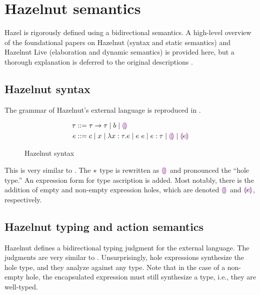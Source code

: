\section{Hazelnut semantics}
\label{sec:hazel-semantics}

Hazel is rigorously defined using a bidirectional semantics. A high-level overview of the foundational papers on Hazelnut (syntax and static semantics) and Hazelnut Live (elaboration and dynamic semantics) is provided here, but a thorough explanation is deferred to the original descriptions \cite{conf/popl/Hazelnut17,conf/popl/HazelnutLive19}.

\subsection{Hazelnut syntax}
\label{sec:hazel-syntax}

The grammar of Hazelnut's external language is reproduced in .

\begin{figure}
  \centering
  \begin{singlespace}
    \begin{align*}
      \tau &::= \tau\to\tau
             \mid b
             \mid \textcolor{violet}{\llparenthesis}\textcolor{violet}{\rrparenthesis} \\
      e &::= c
          \mid x
          \mid\lambda x:\tau.e
          \mid e\ e
          \mid e:\tau
          \mid \textcolor{violet}{\llparenthesis}\textcolor{violet}{\rrparenthesis}
          \mid \textcolor{violet}{\llparenthesis} e\textcolor{violet}{\rrparenthesis}
    \end{align*}
  \end{singlespace}  
  \caption{Hazelnut syntax}
  \label{fig:hazelnut-syntax}
\end{figure}

This is very similar to \gtlc{}. The $*{}$ type is rewritten as $\textcolor{violet}{\llparenthesis}\textcolor{violet}{\rrparenthesis}$ and pronounced the ``hole type.'' An expression form for type ascription is added. Most notably, there is the addition of empty and non-empty expression holes, which are denoted $\textcolor{violet}{\llparenthesis}\textcolor{violet}{\rrparenthesis}$ and $\textcolor{violet}{\llparenthesis} e\textcolor{violet}{\rrparenthesis}$, respectively.

\subsection{Hazelnut typing and action semantics}
\label{sec:hazel-statics}

Hazelnut \cite{conf/popl/Hazelnut17} defines a bidirectional typing judgment for the external language. The judgments are very similar to \gtlc{}. Unsurprisingly, hole expressions synthesize the hole type, and they analyze against any type. Note that in the case of a non-empty hole, the encapsulated expression must still synthesize a type, i.e., they are well-typed.

